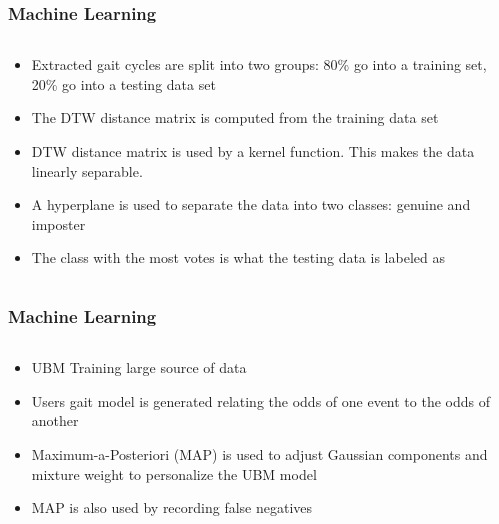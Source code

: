 \documentclass{beamer}
\begin{document}
\begin{frame}
\frametitle{Machine Learning}
 \begin{columns}
  \begin{column}{.5\textwidth}
  \begin{itemize}
		\item Extracted gait cycles are split into two groups: 80\% go into a training set, 20\% go into a testing data set
		\item The DTW distance matrix is computed from the training data set
		\item DTW distance matrix is used by a kernel function. This makes the data linearly separable.
		\item A hyperplane is used to separate the data into two classes: genuine and imposter
		\item The class with the most votes is what the testing data is labeled as
  \end{itemize}
  \end{column}
  \begin{column}{0.7\textwidth}
       \\
  \end{column}
  \end{columns}  
\end{frame}

 \begin{frame}
\frametitle{Machine Learning}
 \begin{columns}
  \begin{column}{.7\textwidth}
  \begin{itemize}
		\item UBM Training large source of data
		\item Users gait model is generated relating the odds of one event to the odds of another
		\item Maximum-a-Posteriori (MAP) is used to adjust Gaussian components and mixture weight to personalize the UBM model
		\item MAP is also used by recording false negatives
  \end{itemize}
  \end{column}
  \begin{column}{0.7\textwidth}
       \\
  \end{column}
  \end{columns}  
\end{frame}
\end{document}

